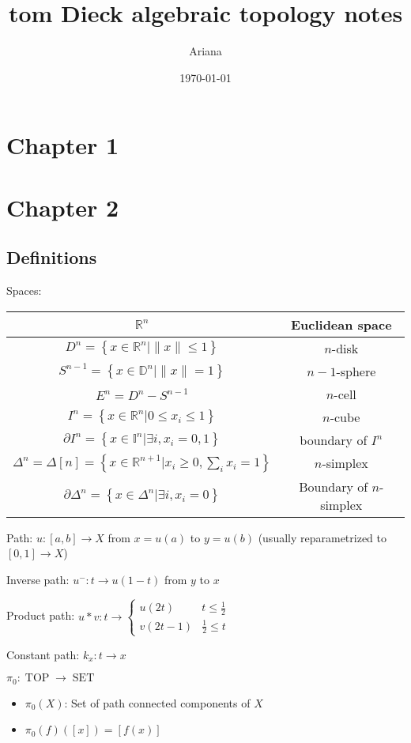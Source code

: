 \documentclass[12pt]{article}
\title{tom Dieck algebraic topology notes}
\date{\today}
\author{Ariana}
\newcommand{\mb}{\mathbb}
\DeclareMathOperator{\SET}{SET}
\DeclareMathOperator{\TOP}{TOP}
\begin{document}
    
\section{Chapter 1}
\section{Chapter 2}

\subsection{Definitions}

Spaces:

\begin{tabular}{cc}\hline
    $\mb R^n$&Euclidean space\\\hline
    $D^n=\left\{x\in\mb R^n|\lVert x\rVert\leq1\right\}$&$n$-disk\\\hline
    $S^{n-1}=\left\{x\in\mb D^n|\lVert x\rVert=1\right\}$&$n-1$-sphere\\\hline
    $E^n=D^n-S^{n-1}$&$n$-cell\\\hline
    $I^n=\left\{x\in\mb R^n|0\leq x_i\leq1\right\}$&$n$-cube\\\hline
    $\partial I^n=\left\{x\in\mb I^n|\exists i,x_i=0,1\right\}$&boundary of $I^n$\\\hline
    $\Delta^n=\Delta[n]=\left\{x\in\mb R^{n+1}|x_i\geq0,\sum_ix_i=1\right\}$&$n$-simplex\\\hline
    $\partial\Delta^n=\left\{x\in\Delta^n|\exists i,x_i=0\right\}$&Boundary of $n$-simplex\\\hline
\end{tabular}

Path: $u:[a,b]\to X$ from $x=u(a)$ to $y=u(b)$ (usually reparametrized to $[0,1]\to X$)

Inverse path: $u^-:t\to u(1-t)$ from $y$ to $x$

Product path: $u*v:t\to\begin{cases}u(2t)&t\leq\frac12\\v(2t-1)&\frac12\leq t\end{cases}$

Constant path: $k_x:t\to x$

$\pi_0:\TOP\to\SET$
\begin{itemize}
    \item $\pi_0(X)$: Set of path connected components of $X$
    \item $\pi_0(f)([x])=[f(x)]$
\end{itemize}
\end{document}
